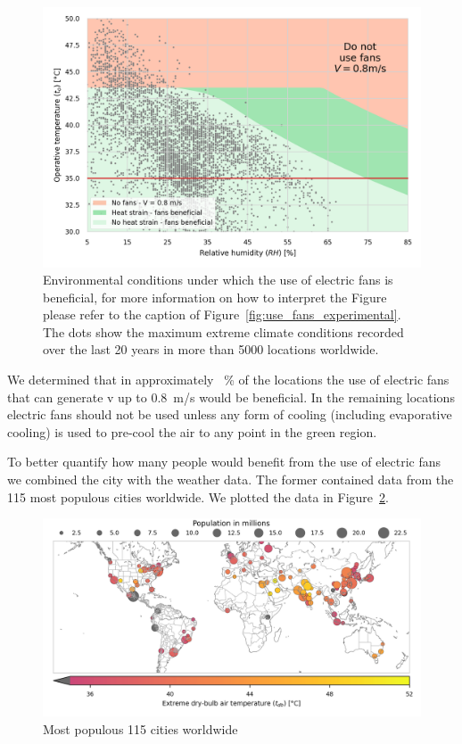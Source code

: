 \begin{figure}[hbt!]
    \centering
    \includegraphics[width=\textwidth]{figures/use_fans}
    \caption{Environmental conditions under which the use of electric fans is beneficial, for more information on how to interpret the Figure please refer to the caption of Figure~\ref{fig:use_fans_experimental}.
    The dots show the maximum extreme climate conditions recorded over the last 20 years in more than 5000 locations worldwide.}
    \label{fig:energy_storage_delta}
\end{figure}

We determined that in approximately ~\% of the locations the use of electric fans that can generate \ac{v} up to 0.8~m/s would be beneficial.
In the remaining locations electric fans should not be used unless any form of cooling (including evaporative cooling) is used to pre-cool the air to any point in the green region.

To better quantify how many people would benefit from the use of electric fans we combined the city with the weather data.
The former contained data from the 115 most populous cities worldwide.
We plotted the data in Figure~\ref{fig:map-population-temperature}.

\begin{figure}[hbt!]
    \centering
    \includegraphics[width=\textwidth]{figures/map-population-temperature}
    \caption{Most populous 115 cities worldwide}
    \label{fig:map-population-temperature}
\end{figure}

